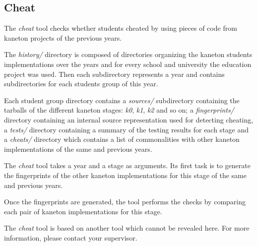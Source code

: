 %
%
%
%
%
%

%
%

\subsection{Cheat}
\label{section:cheat}

The \textit{cheat} tool checks whether students cheated by using pieces of
code from kaneton projects of the previous years.

The \textit{history/} directory is composed of directories organizing the
kaneton students implementations over the years and for every school and
university the education project was used. Then each subdirectory represents
a year and contains subdirectories for each students group of this year.

Each student group directory contains a \textit{sources/} subdirectory
containing the tarballs of the different kaneton stages: \textit{k0},
\textit{k1}, \textit{k2} and so on; a \textit{fingerprints/} directory
containing an internal source representation used for detecting cheating,
a \textit{tests/} directory containing a summary of the testing results
for each stage and a \textit{cheats/} directory which contains a list of
commonalities with other kaneton implementations of the same and previous
years.

The \textit{cheat} tool takes a year and a stage as arguments. Its first
task is to generate the fingerprints of the other kaneton implementations
for this stage of the same and previous years.

Once the fingerprints are generated, the tool performs the checks by
comparing each pair of kaneton implementations for this stage.

The \textit{cheat} tool is based on another tool which cannot be revealed
here. For more information, please contact your supervisor.
